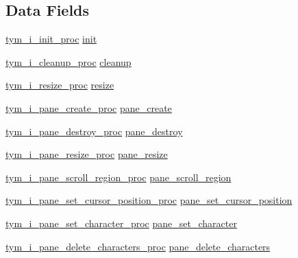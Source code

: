 \subsection*{Data Fields}
\begin{DoxyCompactItemize}
\item 
\hyperlink{backend_8h_a1d8c83e098af07295e7c8c6aaff509f8}{tym\+\_\+i\+\_\+init\+\_\+proc} \hyperlink{structtym__i__backend_a9e5755b91dadb2460eb67423e126cf60}{init}
\item 
\hyperlink{backend_8h_a71c0f80d2ad6f4c617855bed5f727832}{tym\+\_\+i\+\_\+cleanup\+\_\+proc} \hyperlink{structtym__i__backend_af3dd909e074449e20489addd04a9409b}{cleanup}
\item 
\hyperlink{backend_8h_a969a37c5dad74fed827c63879a3ea594}{tym\+\_\+i\+\_\+resize\+\_\+proc} \hyperlink{structtym__i__backend_a6a9798091f83b97b02c2765ab9ab7f5b}{resize}
\item 
\hyperlink{backend_8h_ab44c405291766aa8377ccabbf142c682}{tym\+\_\+i\+\_\+pane\+\_\+create\+\_\+proc} \hyperlink{structtym__i__backend_ac09a0c208115068effc8a0de70136c63}{pane\+\_\+create}
\item 
\hyperlink{backend_8h_a7c52fa9848f5daacdca285c8e25c6daf}{tym\+\_\+i\+\_\+pane\+\_\+destroy\+\_\+proc} \hyperlink{structtym__i__backend_a26f012c047a54997dbfd52868c723fe5}{pane\+\_\+destroy}
\item 
\hyperlink{backend_8h_ae66adc784ab9e9adcb7f43713798b754}{tym\+\_\+i\+\_\+pane\+\_\+resize\+\_\+proc} \hyperlink{structtym__i__backend_a625938e1dcc5d0b40561b42c0d37a794}{pane\+\_\+resize}
\item 
\hyperlink{backend_8h_a8f701dd0984f9c7aa9f76fcd2df15a27}{tym\+\_\+i\+\_\+pane\+\_\+scroll\+\_\+region\+\_\+proc} \hyperlink{structtym__i__backend_a995d60cb63fc0ac13220fda8628c4267}{pane\+\_\+scroll\+\_\+region}
\item 
\hyperlink{backend_8h_af5c21e9bc7ce1861a821cf0b8f3baa24}{tym\+\_\+i\+\_\+pane\+\_\+set\+\_\+cursor\+\_\+position\+\_\+proc} \hyperlink{structtym__i__backend_a6422b6a50ad3afbc5732bbef76953ac7}{pane\+\_\+set\+\_\+cursor\+\_\+position}
\item 
\hyperlink{backend_8h_a4a3d0bb3b2fb6baa1f86e39770756a18}{tym\+\_\+i\+\_\+pane\+\_\+set\+\_\+character\+\_\+proc} \hyperlink{structtym__i__backend_a0840c9980f7b7de92870d92787199940}{pane\+\_\+set\+\_\+character}
\item 
\hyperlink{backend_8h_a0926d88cba57a1e598f92df346d9d6a3}{tym\+\_\+i\+\_\+pane\+\_\+delete\+\_\+characters\+\_\+proc} \hyperlink{structtym__i__backend_a7c0e3c008f7c54c8c6f232cdde226a38}{pane\+\_\+delete\+\_\+characters}

\end{DoxyCompactItemize}
